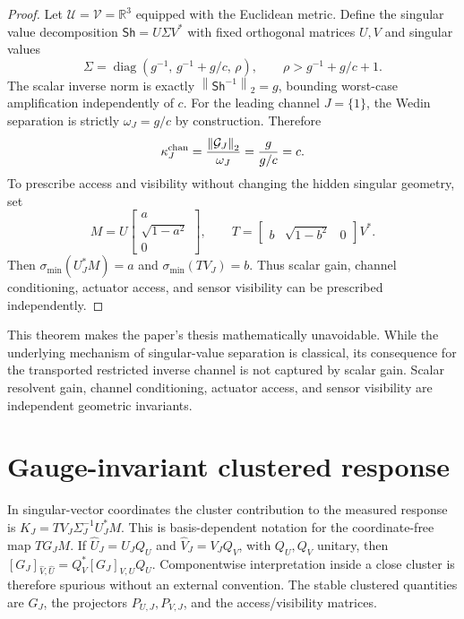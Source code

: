 \documentclass[review]{siamart220329}
\theoremstyle{definition}
\theoremstyle{remark}
\newcommand{\R}{\mathbb{R}}
\newcommand{\calU}{\mathcal{U}}
\newcommand{\calV}{\mathcal{V}}
\newcommand{\Sh}{\mathsf{Sh}}
\newcommand{\smin}{\sigma_{\min}}
\newcommand{\norm}[1]{\left\lVert #1\right\rVert}
\begin{document}
\begin{proof}
Let $\calU=\calV=\R^3$ equipped with the Euclidean metric. Define the singular
value decomposition $\Sh=U\Sigma V^*$ with fixed orthogonal matrices $U,V$ and
singular values
\begin{equation}
    \Sigma=\operatorname{diag}\left(g^{-1},\,g^{-1}+g/c,\,\rho\right),
    \qquad
    \rho>g^{-1}+g/c+1 .
\end{equation}
The scalar inverse norm is exactly $\norm{\Sh^{-1}}_2=g$, bounding worst-case
amplification independently of $c$. For the leading channel $J=\{1\}$, the
Wedin separation is strictly $\omega_J=g/c$ by construction. Therefore
\begin{equation}
    \kappa_J^{\rm chan}
    =
    \frac{\norm{\mathcal G_J}_2}{\omega_J}
    =
    \frac{g}{g/c}
    =
    c .
\end{equation}
To prescribe access and visibility without changing the hidden singular
geometry, set
\begin{equation}
    M=U
    \begin{bmatrix}
    a\\
    \sqrt{1-a^2}\\
    0
    \end{bmatrix},
    \qquad
    T=
    \begin{bmatrix}
    b & \sqrt{1-b^2} & 0
    \end{bmatrix}V^* .
\end{equation}
Then $\smin(U_J^*M)=a$ and $\smin(TV_J)=b$. Thus scalar gain, channel
conditioning, actuator access, and sensor visibility can be prescribed
independently.
\end{proof}

This theorem makes the paper's thesis mathematically unavoidable. While the
underlying mechanism of singular-value separation is classical, its consequence
for the transported restricted inverse channel is not captured by scalar gain.
Scalar resolvent gain, channel conditioning, actuator access, and sensor
visibility are independent geometric invariants.

\section{Gauge-invariant clustered response}\label{sec:clustered-response}

In singular-vector coordinates the cluster contribution to the measured response is $K_J=TV_J\Sigma_J^{-1}U_J^*M$. This is basis-dependent notation for the coordinate-free map $TG_JM$. If $\widehat U_J=U_JQ_U$ and $\widehat V_J=V_JQ_V$, with $Q_U,Q_V$ unitary, then $[G_J]_{\widehat V,\widehat U}=Q_V^*[G_J]_{V,U}Q_U$. Componentwise interpretation inside a close cluster is therefore spurious without an external convention. The stable clustered quantities are $G_J$, the projectors $P_{U,J}, P_{V,J}$, and the access/visibility matrices.
\end{document}
